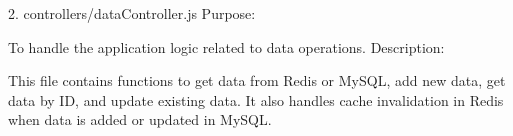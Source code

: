 2. controllers/dataController.js
Purpose:

To handle the application logic related to data operations.
Description:

This file contains functions to get data from Redis or MySQL, add new data,
get data by ID, and update existing data. It also handles cache invalidation
in Redis when data is added or updated in MySQL.